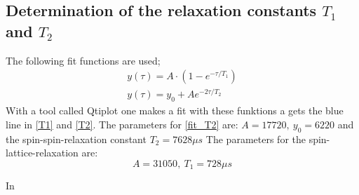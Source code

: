     \subsection{Determination of the relaxation constants $T_1$ and $T_2$}
    The following fit functions are used;
    \begin{gather}
        y(\tau) = A\cdot(1-e^{-\tau/T_1})\label{fit_T1}\\
        y(\tau) = y_0 + Ae^{-2\tau/T_2}\label{fit_T2}
    \end{gather}
    With a tool called Qtiplot one makes a fit with these funktions a gets the blue line in \ref{T1} and \ref{T2}. The parameters for \ref{fit_T2} are: $A = 17720,\ y_0 = 6220$ and the spin-spin-relaxation constant $T_2 = 7628\unit{\mu s}$
    The parameters for the spin-lattice-relaxation are:
    $$ A = 31050,\ T_1 = 728\unit{\mu s} $$
    
    \label{task_4}
    In 
